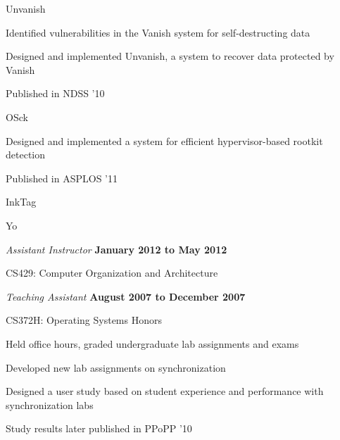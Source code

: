 \documentclass[10pt]{article}
\newenvironment{outerlist}[1][\enskip\textbullet]%
        {\begin{itemize}[#1]}{\end{itemize}%
         \vspace{-.6\baselineskip}}
\newenvironment{innerlist}[1][\enskip\textbullet]%
        {\begin{compactitem}[#1]}{\end{compactitem}}
\begin{document}
\begin{outerlist}
\begin{innerlist}
        \item Unvanish
        \begin{innerlist}
           \item Identified vulnerabilities in the Vanish system for
self-destructing data
           \item Designed and implemented Unvanish, a system to recover
data protected by Vanish
           \item Published in NDSS '10
         \end{innerlist}
         \item OSck
         \begin{innerlist}
            \item Designed and implemented a system for efficient
hypervisor-based rootkit detection
            \item Published in ASPLOS '11
         \end{innerlist}
         \item InkTag
         \begin{innerlist}
            \item Yo
         \end{innerlist}
    \end{innerlist}
\item[] \textit{Assistant Instructor}%
        \hfill \textbf{January 2012 to May 2012}
        \begin{innerlist}
           \item CS429: Computer Organization and Architecture
        \end{innerlist}
\item[] \textit{Teaching Assistant}%
        \hfill \textbf{August 2007 to December 2007}
        \begin{innerlist}
           \item CS372H: Operating Systems Honors
           \begin{innerlist}
              \item Held office hours, graded undergraduate lab assignments and exams
              \item Developed new lab assignments on synchronization
              \item Designed a user study based on student experience and
performance with synchronization labs
              \item Study results later published in PPoPP '10
           \end{innerlist}
        \end{innerlist}
\end{outerlist}
\end{document}
